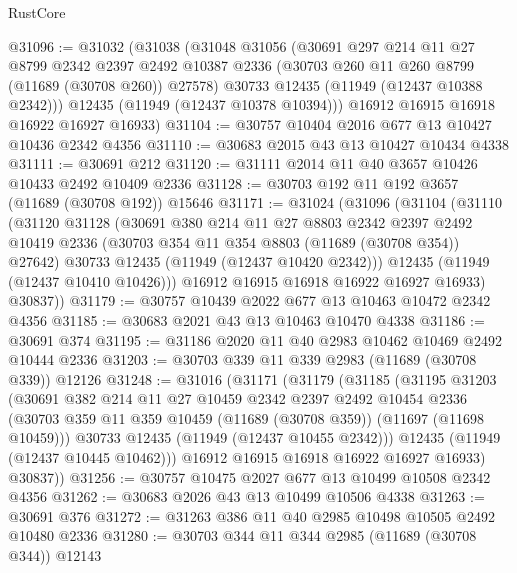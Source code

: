 \begin{lexlean}{RustCore}
\begin{coremodule}
@31096 := @31032
    (@31038
      (@31048
        @31056
        (@30691
          @297
          @214
          @11
          @27
          @8799
          @2342
          @2397
          @2492
          @10387
          @2336
          (@30703 @260 @11 @260 @8799 (@11689 (@30708 @260)) @27578)
          @30733
          @12435
          (@11949 (@12437 @10388 @2342)))
        @12435
        (@11949 (@12437 @10378 @10394)))
      @16912
      @16915
      @16918
      @16922
      @16927
      @16933)
@31104 := @30757 @10404 @2016 @677 @13 @10427 @10436 @2342 @4356
@31110 := @30683 @2015 @43 @13 @10427 @10434 @4338
@31111 := @30691 @212
@31120 := @31111 @2014 @11 @40 @3657 @10426 @10433 @2492 @10409 @2336
@31128 := @30703 @192 @11 @192 @3657 (@11689 (@30708 @192)) @15646
@31171 := @31024
    (@31096
      (@31104
        (@31110
          (@31120
            @31128
            (@30691
              @380
              @214
              @11
              @27
              @8803
              @2342
              @2397
              @2492
              @10419
              @2336
              (@30703 @354 @11 @354 @8803 (@11689 (@30708 @354)) @27642)
              @30733
              @12435
              (@11949 (@12437 @10420 @2342)))
            @12435
            (@11949 (@12437 @10410 @10426)))
          @16912
          @16915
          @16918
          @16922
          @16927
          @16933)
        @30837))
@31179 := @30757 @10439 @2022 @677 @13 @10463 @10472 @2342 @4356
@31185 := @30683 @2021 @43 @13 @10463 @10470 @4338
@31186 := @30691 @374
@31195 := @31186 @2020 @11 @40 @2983 @10462 @10469 @2492 @10444 @2336
@31203 := @30703 @339 @11 @339 @2983 (@11689 (@30708 @339)) @12126
@31248 := @31016
    (@31171
      (@31179
        (@31185
          (@31195
            @31203
            (@30691
              @382
              @214
              @11
              @27
              @10459
              @2342
              @2397
              @2492
              @10454
              @2336
              (@30703 @359 @11 @359 @10459 (@11689 (@30708 @359)) (@11697 (@11698 @10459)))
              @30733
              @12435
              (@11949 (@12437 @10455 @2342)))
            @12435
            (@11949 (@12437 @10445 @10462)))
          @16912
          @16915
          @16918
          @16922
          @16927
          @16933)
        @30837))
@31256 := @30757 @10475 @2027 @677 @13 @10499 @10508 @2342 @4356
@31262 := @30683 @2026 @43 @13 @10499 @10506 @4338
@31263 := @30691 @376
@31272 := @31263 @386 @11 @40 @2985 @10498 @10505 @2492 @10480 @2336
@31280 := @30703 @344 @11 @344 @2985 (@11689 (@30708 @344)) @12143

\end{coremodule}
\end{lexlean}
